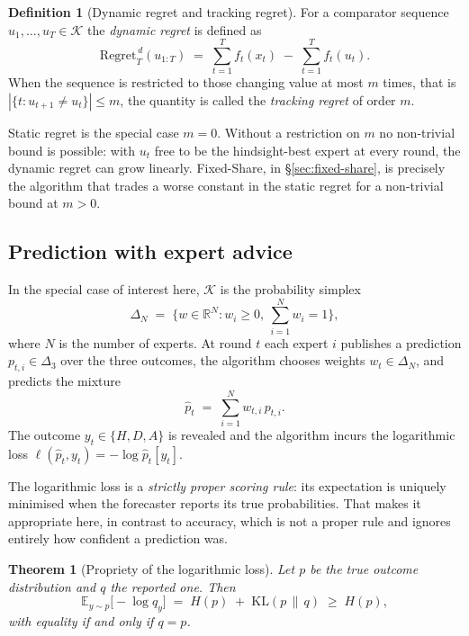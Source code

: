 \documentclass[12pt,a4paper,oneside]{report}
\renewcommand{\_}{\oldunderscore\allowbreak}
\theoremstyle{definition}
\newtheorem{definition}{Definition}[chapter]
\theoremstyle{plain}
\newtheorem{theorem}{Theorem}[chapter]
\theoremstyle{definition}   %
\begin{document}
\begin{definition}[Dynamic regret and tracking regret]
\label{def:dynamic-regret}
For a comparator sequence $u_1,\dots,u_T \in \mathcal{K}$ the \emph{dynamic regret} is defined
as
\[
\mathrm{Regret}_T^{\,d}(u_{1:T}) \;=\; \sum_{t=1}^{T} f_t(x_t) \;-\; \sum_{t=1}^{T} f_t(u_t).
\]
When the sequence is restricted to those changing value at most $m$ times, that is
$|\{t : u_{t+1}\neq u_t\}| \leq m$, the quantity is called the \emph{tracking regret} of order
$m$.
\end{definition}

Static regret is the special case $m=0$. Without a restriction on $m$ no non-trivial bound is
possible: with $u_t$ free to be the hindsight-best expert at every round, the dynamic regret
can grow linearly. Fixed-Share, in \S\ref{sec:fixed-share}, is precisely the algorithm that
trades a worse constant in the static regret for a non-trivial bound at $m>0$.

\subsection{Prediction with expert advice}

In the special case of interest here, $\mathcal{K}$ is the probability simplex
\[
\Delta_N \;=\; \Big\{ w \in \mathbb{R}^N : w_i \geq 0,\ \textstyle\sum_{i=1}^{N} w_i = 1 \Big\},
\]
where $N$ is the number of experts. At round $t$ each expert $i$ publishes a prediction
$p_{t,i} \in \Delta_3$ over the three outcomes, the algorithm chooses weights
$w_t \in \Delta_N$, and predicts the mixture
\[
\hat{p}_t \;=\; \sum_{i=1}^{N} w_{t,i}\, p_{t,i}.
\]
The outcome $y_t \in \{H,D,A\}$ is revealed and the algorithm incurs the logarithmic loss
$\ell(\hat{p}_t, y_t) = -\log \hat{p}_{t}[y_t]$.

The logarithmic loss is a \emph{strictly proper scoring rule}: its expectation is uniquely
minimised when the forecaster reports its true probabilities. That makes it appropriate here,
in contrast to accuracy, which is not a proper rule and ignores entirely how confident a
prediction was.

\begin{theorem}[Propriety of the logarithmic loss]
\label{thm:propriety}
Let $p$ be the true outcome distribution and $q$ the reported one. Then
\[
\mathbb{E}_{y\sim p}\big[-\log q_y\big] \;=\; H(p) \;+\; \mathrm{KL}(p \,\|\, q) \;\geq\; H(p),
\]
with equality if and only if $q = p$.
\end{theorem}
\end{document}

